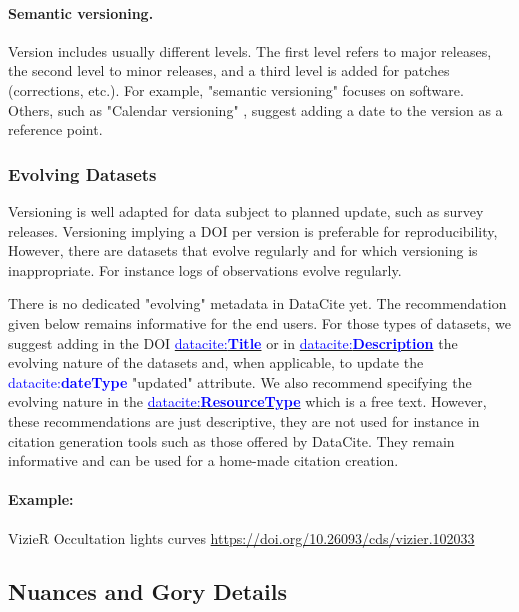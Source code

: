 \documentclass[11pt,a4paper]{ivoa}
\newcommand{\datacitedocurl}{https://datacite-metadata-schema.readthedocs.io/en/4.6}
\newcommand{\datacitepropurl}[1]{\datacitedocurl/properties/#1}
\newcommand{\dataciteterm}[1]{\textcolor{blue}{\mbox{datacite:\textbf{#1}}}}
\newcommand{\datacitetag}[2]{\href{\datacitepropurl{#1}}{\textcolor{blue}{\mbox{datacite:\textbf{#2}}}}}
\begin{document}
\paragraph{Semantic versioning.} %
Version includes usually different levels. The first level refers to major releases, the second level to minor releases, and a third level is added for patches (corrections, etc.). For example, "semantic versioning" \citep{preston-werner_semantic_2023} focuses on software. Others, such as "Calendar versioning" \citep{hashemi_calendar_2016}, suggest adding a date to the version as a reference point.

\subsubsection{Evolving Datasets}\hypertarget{evolving-datasets}{}\label{evolving-datasets}

Versioning is well adapted for data subject to planned update, such as survey releases. Versioning implying a DOI per version is preferable for reproducibility, However, there are datasets that evolve regularly and for which versioning is inappropriate. For instance logs of observations evolve regularly.

There is no dedicated "evolving" metadata in DataCite yet. The recommendation given below remains informative for the end users.\newline
For those types of datasets, we suggest adding in the DOI \datacitetag{title}{Title} or in \datacitetag{description}{Description} the evolving nature of the datasets and, when applicable, to update the \dataciteterm{dateType} "updated" attribute. We also recommend specifying the evolving nature in the \datacitetag{resourcetype}{ResourceType} which is a free text. However, these recommendations are just descriptive, they are not used for instance in citation generation tools such as those offered by DataCite. They remain informative and can be used for a home-made citation creation.

\paragraph{Example:} VizieR Occultation lights curves  \newline \url{https://doi.org/10.26093/cds/vizier.102033}

\subsection{Nuances and Gory Details}\hypertarget{nuances-and-gory-details}{}\label{sec:nuances-and-gory-details}
\end{document}

